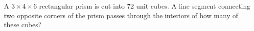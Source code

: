 A $3\times4\times6$ rectangular prism is cut into $72$ unit cubes. A line segment connecting two opposite corners of the prism passes through the interiors of how many of these cubes?
